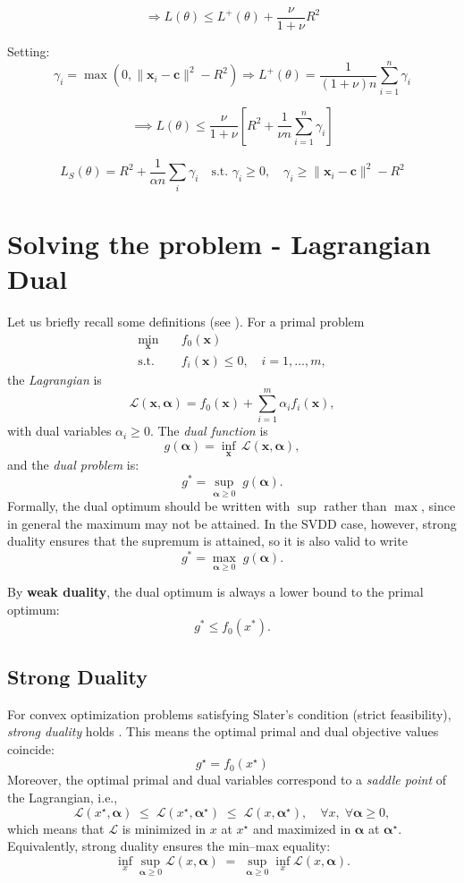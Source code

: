 \documentclass[11pt]{report}
\begin{document}
\[
\Rightarrow L(\theta) \leq L^+(\theta) + \frac{\nu}{1+\nu} R^2
\]


Setting:
\[
\gamma_i = \max(0, \|\boldsymbol{x}_i - \boldsymbol{c}\|^2 - R^2)
\Rightarrow
L^+(\theta) = \frac{1}{(1+\nu)n}\sum _{i=1} ^n \gamma_i
\]

\[
\implies L(\theta) \leq \frac{\nu}{1+\nu}\left[ R^2 + \frac{1}{\nu n} \sum_{i=1}^n \gamma_i \right]
\]

\[
L_S(\theta) = R^2 + \frac{1}{\alpha n} \sum_i \gamma_i \quad \text{s.t. } \gamma_i \geq 0,\quad \gamma_i \geq \|\boldsymbol{x}_i - \boldsymbol{c}\|^2 - R^2
\]

\section{Solving the problem - Lagrangian Dual}
Let us briefly recall some definitions (see \cite[Ch.~5]{boyd2004convex}).  
For a primal problem
\begin{align*}
\min_{\mathbf{x}} \quad & f_0(\mathbf{x}) \\
\text{s.t.} \quad & f_i(\mathbf{x}) \leq 0, \quad i=1,\dots,m,
\end{align*}
the \emph{Lagrangian} is
\[
\mathcal{L}(\mathbf{x}, \boldsymbol{\alpha}) = f_0(\mathbf{x}) + \sum_{i=1}^m \alpha_i f_i(\mathbf{x}),
\]
with dual variables $\alpha_i \geq 0$.  
The \emph{dual function} is
\[
g(\boldsymbol{\alpha}) = \inf_{\mathbf{x}} \, \mathcal{L}(\mathbf{x}, \boldsymbol{\alpha}),
\]
and the \emph{dual problem} is:
\[
g^* = \sup_{\boldsymbol{\alpha} \ge 0} \; g(\boldsymbol{\alpha}).
\]
Formally, the dual optimum should be written with $\sup$ rather than $\max$, 
since in general the maximum may not be attained. In the SVDD case, however, 
strong duality ensures that the supremum is attained, so it is also valid to write
\[
g^* = \max_{\boldsymbol{\alpha} \ge 0} \; g(\boldsymbol{\alpha}).
\]

By \textbf{weak duality}, the dual optimum is always a lower bound to the primal optimum:
\[
g^* \le f_0(x^*).
\]

\subsection{Strong Duality}
For convex optimization problems satisfying Slater's condition (strict feasibility), \emph{strong duality} holds \cite[Section~5.3]{boyd2004convex}.  
This means the optimal primal and dual objective values coincide:
\[
g^\star = f_0(x^\star)
\]
Moreover, the optimal primal and dual variables correspond to a \emph{saddle point} of the Lagrangian, i.e.,
\[
\mathcal{L}(x^\star, \boldsymbol{\alpha}) \;\le\; \mathcal{L}(x^\star, \boldsymbol{\alpha}^\star) 
\;\le\; \mathcal{L}(x, \boldsymbol{\alpha}^\star), 
\quad \forall x, \; \forall \boldsymbol{\alpha} \ge 0,
\]
which means that $\mathcal{L}$ is minimized in $x$ at $x^\star$ and maximized in $\boldsymbol{\alpha}$ at $\boldsymbol{\alpha}^\star$.  
Equivalently, strong duality ensures the min–max equality:
\[
\inf_x \sup_{\boldsymbol{\alpha} \ge 0} \mathcal{L}(x,\boldsymbol{\alpha})
\;=\;
\sup_{\boldsymbol{\alpha} \ge 0} \inf_x \mathcal{L}(x,\boldsymbol{\alpha}).
\]
\end{document}
